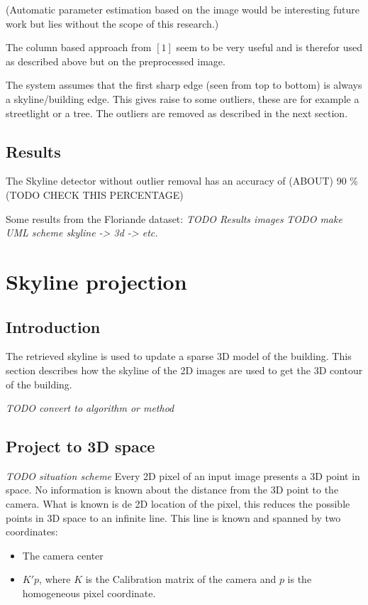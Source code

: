 \documentclass[10pt]{article}
\begin{document}
(Automatic parameter estimation based on the image would be interesting future
work but lies without the scope of this research.)

The column based approach from $[1]$ seem to be very useful and is therefor
used as described above but on the preprocessed image.

The system assumes that the first sharp edge (seen from top to bottom) is
always a skyline/building edge. This gives raise to some outliers, these are
for example a streetlight or a tree. The outliers are removed as described in
the next section.  

 \subsection{Results}%
The Skyline detector without outlier removal has an
accuracy of (ABOUT) 90 \% (TODO CHECK THIS PERCENTAGE) 

Some results from the Floriande dataset:
\textit{ TODO Results images}
\textit{ TODO make UML scheme skyline -> 3d -> etc.}
\\

\section{Skyline projection}
 \subsection{Introduction}
The retrieved skyline is used to update a sparse 3D model of the building.
This section describes how the skyline of the 2D images are used to get the 3D contour of the building. 

\textit{TODO convert to algorithm or method }
 
\subsection{Project to 3D space}
\textit{ TODO situation scheme}
Every 2D pixel of an input image presents a 3D point in space. No
information is known about the distance from the 3D point to the camera. What
is known is de 2D location of the pixel, this reduces the possible points in 3D
space to an infinite line.  This line is known and spanned by two 
coordinates:\\ 
\begin{itemize}
	\item The camera center %
	\item $K'p$, where $K$ is the Calibration matrix of the camera and $p$ is the homogeneous pixel coordinate.
\end{itemize}
\end{document}
